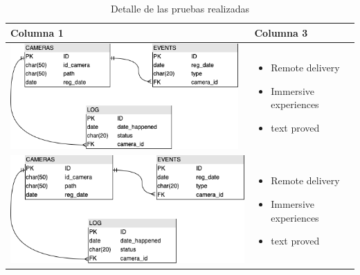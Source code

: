\begin{table}[H]
    \caption{Detalle de las pruebas realizadas}
    \begin{center}
        \begin{tabular}{|>{\centering}p{}|m{}<{\centering}|} 
            \hline
            \textbf{Columna 1} & \textbf{Columna 3} \\
            \hline
            \begin{minipage}{.3\textwidth}
                \includegraphics[width=\linewidth, height=40mm]{img/capitulo_4/db.png}
            \end{minipage}
            & \begin{itemize} 
                \item Remote delivery 
                \item Immersive experiences
                \item text proved
            \end{itemize} \\ 
            \hline
            \begin{minipage}{0.6\textwidth}
                \includegraphics[width=\linewidth]{img/capitulo_4/db.png}
            \end{minipage} & \begin{itemize} 
                \item Remote delivery 
                \item Immersive experiences
                \item text proved
            \end{itemize} \\
            \hline
        \end{tabular}
    \end{center}
\end{table}


